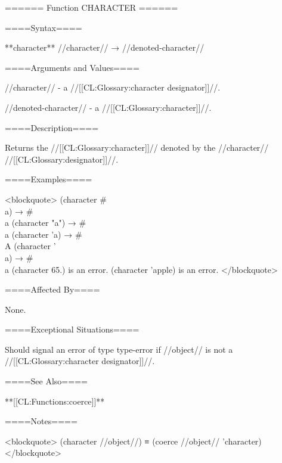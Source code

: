 ====== Function CHARACTER ======

====Syntax====

**character** //character// → //denoted-character//

====Arguments and Values====

//character// - a //[[CL:Glossary:character designator]]//.

//denoted-character// - a //[[CL:Glossary:character]]//.

====Description====

Returns the //[[CL:Glossary:character]]// denoted by the //character// //[[CL:Glossary:designator]]//.

====Examples====

<blockquote> (character #\\a) → #\\a (character "a") → #\\a (character 'a) → #\\A (character '\\a) → #\\a (character 65.) is an error. (character 'apple) is an error. </blockquote>

====Affected By====

None.

====Exceptional Situations====

Should signal an error of type type-error if //object// is not a //[[CL:Glossary:character designator]]//.

====See Also====

**[[CL:Functions:coerce]]**

====Notes====

<blockquote> (character //object//) ≡ (coerce //object// 'character) </blockquote>

